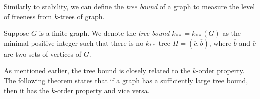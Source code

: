
    Similarly to stability, we can define the \emph{tree bound} of a graph to measure the level of freeness from $k$-trees
    of graph.

    \begin{definition}[Definition 2.11] \label{def:tree_bound}
        Suppose $G$ is a finite graph.
        We denote the \emph{tree bound} $k_{**} = k_{**}(G)$ as the minimal positive integer such that there is no $k_{**}$-tree
        $H = (\overline{c},\overline{b})$, where $\overline{b}$ and $\overline{c}$ are two sets of vertices of $G$.
    \end{definition}

    As mentioned earlier, the tree bound is closely related to the $k$-order property.
    The following theorem states that if a graph has a sufficiently large tree bound, then it has the $k$-order property
    and vice versa.

